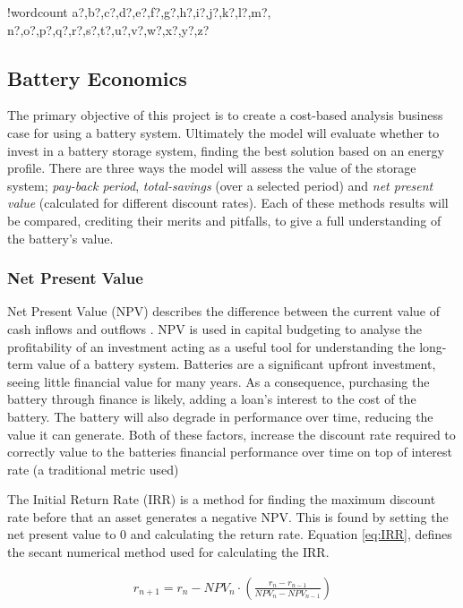 \documentclass[fontsize=9.5pt]{extarticle}
\numberwithin{figure}{section} %
\newcounter{words}
\newenvironment{counted}{%
  \setcounter{words}{0}
  \SearchList!{wordcount}{\stepcounter{words}}
    {a?,b?,c?,d?,e?,f?,g?,h?,i?,j?,k?,l?,m?,
    n?,o?,p?,q?,r?,s?,t?,u?,v?,w?,x?,y?,z?}
  \UndoBoundary{'}
  \SearchOrder{p;}}{%
  \StopSearching}
\begin{document}
\begin{counted}
\subsection{Battery Economics}\label{battery-economics}

The primary objective of this project is to create a cost-based analysis
business case for using a battery system. Ultimately the model will
evaluate whether to invest in a battery storage system, finding the best
solution based on an energy profile. There are three ways the model will
assess the value of the storage system; \emph{pay-back period},
\emph{total-savings} (over a selected period) and \emph{net present
value} (calculated for different discount rates). Each of these methods
results will be compared, crediting their merits and pitfalls, to give a
full understanding of the battery's value.

\subsubsection{Net Present Value}\label{net-present-value}

Net Present Value (NPV) describes the difference between the current
value of cash inflows and outflows \cite{NetPrese35:online}. NPV is used
in capital budgeting to analyse the profitability of an investment
acting as a useful tool for understanding the long-term value of a
battery system. Batteries are a significant upfront investment, seeing
little financial value for many years. As a consequence, purchasing the
battery through finance is likely, adding a loan's interest to the cost
of the battery. The battery will also degrade in performance over time,
reducing the value it can generate. Both of these factors, increase the
discount rate required to correctly value to the batteries financial
performance over time on top of interest rate (a traditional metric
used)

The Initial Return Rate (IRR) is a method for finding the maximum
discount rate before that an asset generates a negative NPV. This is
found by setting the net present value to 0 and calculating the return
rate. Equation \ref{eq:IRR}, defines the secant numerical method used
for calculating the IRR.

\begin{align}
r_{ n+1 }=r_{ n }-{ NPV }_{ n }\cdot \left( \frac { r_{ n }-r_{ n-1 } }{ { NPV }_{ n }-{ NPV }_{ n-1 } }  \right)
\label{eq:IRR}
\end{align}


\end{counted}
\end{document}
